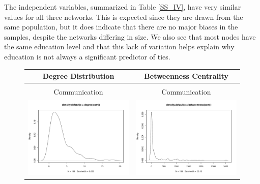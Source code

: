 \documentclass[fleqn,12pt]{wlscirep}
\begin{document}
The independent variables, summarized in Table \ref{SS_IV}, have very similar values for all three networks. This is expected since they are drawn from the same population, but it does indicate that there are no major biases in the samples, despite the networks differing in size. We also see that most nodes have the same education level and that this lack of variation helps explain why education is not always a significant predictor of ties.\\

\begin{figure}
\begin{longtable}[!h]{cc}
Degree Distribution & Betweenness Centrality\\
\hline \\[-1.8ex]
Communication & Communication\\
\includegraphics[height=.2\textheight, clip=true, trim=1cm 1cm 0cm 2cm]{figures/deg_com.pdf} & 
\includegraphics[height=.2\textheight, clip=true, trim=1cm 1cm 0cm 2cm]{figures/cen_com.pdf} \\ 


\end{longtable}
\end{figure}
\end{document}
